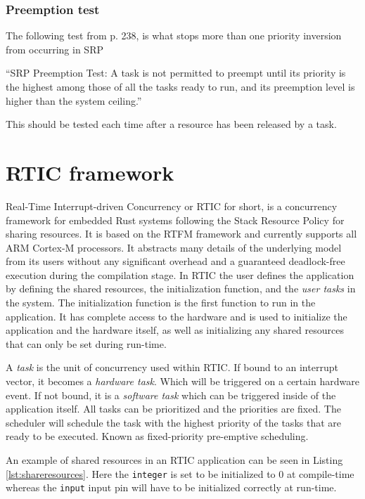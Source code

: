 \subsubsection{Preemption test}
The following test from \cite{hardrealtimecomputingsystems} p. 238, is what
stops more than one priority inversion from occurring in SRP
\begin{displayquote}
    “SRP Preemption Test: A task is not permitted to preempt until its priority
    is the highest among those of all the tasks ready to run, and its preemption
    level is higher than the system ceiling.”
\end{displayquote}
This should be tested each time after a resource has been released by a task.


\section{RTIC framework}
Real-Time Interrupt-driven Concurrency or RTIC for short, is a concurrency
framework for embedded Rust systems following the Stack Resource Policy for
sharing resources. It is based on the RTFM framework\cite{rtfm} and currently
supports all ARM Cortex-M processors. It abstracts many details of the underlying
model from its users without any significant overhead and a guaranteed
deadlock-free execution during the compilation stage. In RTIC the user defines
the application by defining the shared resources, the initialization function,
and the \emph{user tasks} in the system. The initialization function is the
first function to run in the application. It has complete access to the
hardware and is used to initialize the application and the hardware itself, as
well as initializing any shared resources that can only be set during run-time.

A \emph{task} is the unit of concurrency used within RTIC. If bound to an
interrupt vector, it becomes a \emph{hardware task}. Which will be
triggered on a certain hardware event. If not bound, it is a \emph{software
task} which can be triggered inside of the application itself. All tasks can
be prioritized and the priorities are fixed. The scheduler will schedule the
task with the highest priority of the tasks that are ready to be executed.
Known as fixed-priority pre-emptive scheduling\cite{fixedpriorityhistory}.

An example of shared resources in an RTIC application can be seen in Listing
\ref{lst:shareresources}. Here the \texttt{integer} is set to be initialized to
$0$ at compile-time whereas the \texttt{input} input pin will have to be initialized
correctly at run-time.


